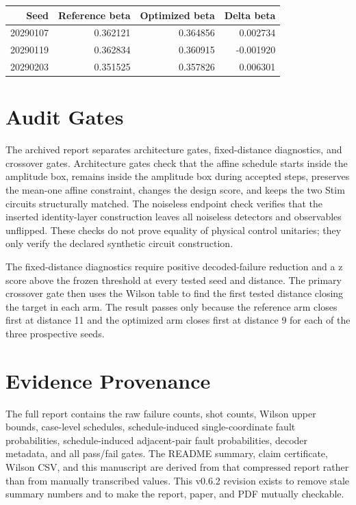 \documentclass[11pt]{article}
\begin{document}
\begin{center}
\begin{tabular}{rrrr}
\toprule
Seed & Reference beta & Optimized beta & Delta beta \\
\midrule
20290107 & 0.362121 & 0.364856 & 0.002734 \\
20290119 & 0.362834 & 0.360915 & -0.001920 \\
20290203 & 0.351525 & 0.357826 & 0.006301 \\
\bottomrule
\end{tabular}
\end{center}


\section{Audit Gates}
The archived report separates architecture gates, fixed-distance diagnostics,
and crossover gates. Architecture gates check that the affine schedule starts
inside the amplitude box, remains inside the amplitude box during accepted
steps, preserves the mean-one affine constraint, changes the design score, and
keeps the two Stim circuits structurally matched. The noiseless endpoint check
verifies that the inserted identity-layer construction leaves all noiseless
detectors and observables unflipped. These checks do not prove equality of
physical control unitaries; they only verify the declared synthetic circuit
construction.

The fixed-distance diagnostics require positive decoded-failure reduction and a
z score above the frozen threshold at every tested seed and distance. The
primary crossover gate then uses the Wilson table to find the first tested
distance closing the target in each arm. The result passes only because the
reference arm closes first at distance 11 and the optimized arm closes first at
distance 9 for each of the three prospective seeds.

\section{Evidence Provenance}
The full report contains the raw failure counts, shot counts, Wilson upper
bounds, case-level schedules, schedule-induced single-coordinate fault
probabilities, schedule-induced adjacent-pair fault probabilities, decoder
metadata, and all pass/fail gates. The README summary, claim certificate,
Wilson CSV, and this manuscript are derived from that compressed report rather
than from manually transcribed values. This v0.6.2 revision exists to remove
stale summary numbers and to make the report, paper, and PDF mutually
checkable.
\end{document}
